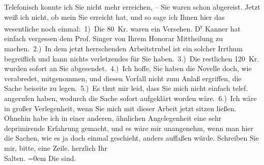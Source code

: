 \begin{ledgroupsized}[t]{13cm}
               Telefonisch konnte ich Sie nicht mehr erreichen, – Sie waren schon abgereist. Jetzt
               weiß ich nicht, ob mein \label{K_L03334-1v}\label{K_L03334-1h} Sie erreicht hat, und so sage ich Ihnen hier das wesentliche noch
               einmal: 1) Die 80 Kr. waren ein Versehen. D\textsuperscript{r}{ }Kanner hat einfach vergessen dem Prof. Singer von Ihrem Honorar Mittheilung zu
               machen. 2.) In dem jetzt herrschenden Arbeitstrubel ist ein solcher Irrthum
               begreiflich und kann nichts verletzendes für Sie haben. 3.) Die restlichen 120 Kr.
               wurden sofort an Sie abgesendet. 4.) Ich hoffe, Sie haben die Novelle doch, wie verabredet, mitgenommen,
               und diesen Vorfall nicht zum Anlaß ergriffen, die Sache beiseite zu legen. 5.) Es
               thut mir leid, dass Sie mich nicht einfach telef. angerufen haben, wodurch die Sache
               sofort aufgeklärt worden wäre. 6.) Ich wäre in großer Verlegenheit, wenn Sie mich mit
               dieser Arbeit jetzt sitzen ließen.\pend
           \pstart
           Ohnehin habe ich in einer anderen, ähnlichen Angelegenheit eine sehr deprimirende
               Erfahrung gemacht, und es wäre mir unangenehm, wenn man hier die Sachen, wie es ja
               doch einmal geschieht, anders auffaßen würde. Schreiben Sie mir, bitte, eine
               Zeile.\pend
           \pstart
           herzlich Ihr {\\[\baselineskip]}\spacefill\mbox{Salten.}\pend
           \leftskip=0em{}\pstart
           \noindent{}\label{K_L03334-2v}\label{K_L03334-2h} Die \label{K_L03334-3v}\label{K_L03334-3h} sind.\pend
           
         
         \endnumbering{}\end{ledgroupsized}  \newcommand{\dateiname}{L03334}\newcommand{\titel}{Felix Salten an Arthur Schnitzler, 4. 9. 1902}\newcommand{\editorInnen}{Martin Anton Müller und Laura Untner}
      